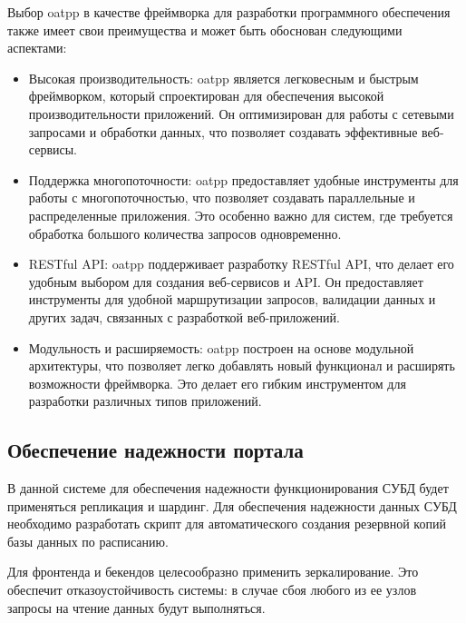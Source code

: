 Выбор oatpp в качестве фреймворка для разработки программного обеспечения также имеет свои преимущества и может быть обоснован следующими аспектами:
\begin{itemize}
    \item Высокая производительность: oatpp является легковесным и быстрым фреймворком, который спроектирован для обеспечения высокой производительности приложений. Он оптимизирован для работы с сетевыми запросами и обработки данных, что позволяет создавать эффективные веб-сервисы.
    \item Поддержка многопоточности: oatpp предоставляет удобные инструменты для работы с многопоточностью, что позволяет создавать параллельные и распределенные приложения. Это особенно важно для систем, где требуется обработка большого количества запросов одновременно.
    \item RESTful API: oatpp поддерживает разработку RESTful API, что делает его удобным выбором для создания веб-сервисов и API. Он предоставляет инструменты для удобной маршрутизации запросов, валидации данных и других задач, связанных с разработкой веб-приложений.
    \item Модульность и расширяемость: oatpp построен на основе модульной архитектуры, что позволяет легко добавлять новый функционал и расширять возможности фреймворка. Это делает его гибким инструментом для разработки различных типов приложений.
\end{itemize} 

\subsection*{Обеспечение надежности портала}

В данной системе для обеспечения надежности функционирования СУБД будет применяться репликация и шардинг. Для обеспечения надежности данных СУБД необходимо разработать скрипт для автоматического создания резервной копий базы данных по расписанию.

Для фронтенда и бекендов целесообразно применить зеркалирование. Это обеспечит отказоустойчивость системы: в случае сбоя любого из ее узлов запросы на чтение данных будут выполняться. 
